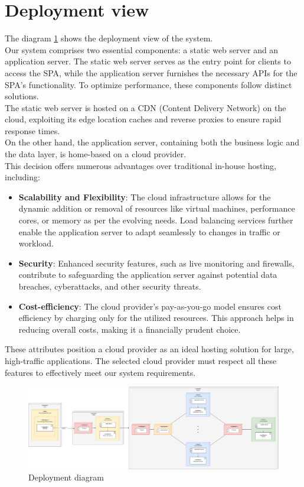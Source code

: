 \section{Deployment view}
The diagram \ref{fig:deployment_diagram} shows the deployment view of the system.\\
Our system comprises two essential components: a static web server and an application server.
The static web server serves as the entry point for clients to access the SPA, while the application server furnishes the necessary APIs for the SPA's functionality.
To optimize performance, these components follow distinct solutions.\\
The static web server is hosted on a CDN (Content Delivery Network) on the cloud, exploiting its edge location caches and reverse proxies to ensure rapid response times. \\
On the other hand, the application server, containing both the business logic and the data layer, is home-based on a cloud provider. \\
This decision offers numerous advantages over traditional in-house hosting, including:
\begin{itemize}
    \item \textbf{Scalability and Flexibility}: The cloud infrastructure allows for the dynamic addition or removal of resources like virtual machines, performance cores, or memory as per the evolving needs. Load balancing services further enable the application server to adapt seamlessly to changes in traffic or workload.
    \item \textbf{Security}: Enhanced security features, such as live monitoring and firewalls, contribute to safeguarding the application server against potential data breaches, cyberattacks, and other security threats.
    \item \textbf{Cost-efficiency}: The cloud provider's pay-as-you-go model ensures cost efficiency by charging only for the utilized resources. This approach helps in reducing overall costs, making it a financially prudent choice.
\end{itemize}
These attributes position a cloud provider as an ideal hosting solution for large, high-traffic applications.
The selected cloud provider must respect all these features to effectively meet our system requirements.

\begin{figure}[ht]
    \centering
    \includegraphics[width=\textwidth]{images/diagrams/deployment_view.png}
    \caption{Deployment diagram}
    \label{fig:deployment_diagram}
\end{figure}

